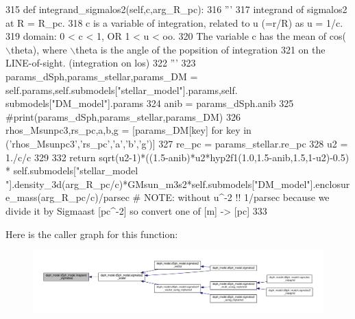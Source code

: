 \begin{DoxyCode}
315     \textcolor{keyword}{def }integrand\_sigmalos2(self,c,arg\_R\_pc):
316         \textcolor{stringliteral}{'''}
317 \textcolor{stringliteral}{        integrand of sigmalos2 at R = R\_pc.}
318 \textcolor{stringliteral}{        c is a variable of integration, related to u (=r/R) as u = 1/c.}
319 \textcolor{stringliteral}{        domain: 0 < c < 1, OR 1 < u < oo.}
320 \textcolor{stringliteral}{        The variable c has the mean of cos(\(\backslash\)theta), where \(\backslash\)theta is the angle of the popsition of
       integration}
321 \textcolor{stringliteral}{        on the LINE-of-sight. (integration on los)}
322 \textcolor{stringliteral}{        '''}
323         params\_dSph,params\_stellar,params\_DM = self.params,self.submodels[\textcolor{stringliteral}{"stellar\_model"}].params,self.
      submodels[\textcolor{stringliteral}{"DM\_model"}].params
324         anib = params\_dSph.anib
325         \textcolor{comment}{#print(params\_dSph,params\_stellar,params\_DM)}
326         rhos\_Msunpc3,rs\_pc,a,b,g = [params\_DM[key] \textcolor{keywordflow}{for} key \textcolor{keywordflow}{in} (\textcolor{stringliteral}{'rhos\_Msunpc3'},\textcolor{stringliteral}{'rs\_pc'},\textcolor{stringliteral}{'a'},\textcolor{stringliteral}{'b'},\textcolor{stringliteral}{'g'})]
327         re\_pc = params\_stellar.re\_pc
328         u2 = 1./c/c
329         
332         \textcolor{keywordflow}{return} sqrt(u2-1)*((1.5-anib)*u2*hyp2f1(1.0,1.5-anib,1.5,1-u2)-0.5) * self.submodels[\textcolor{stringliteral}{"stellar\_model
      "}].density\_3d(arg\_R\_pc/c)*GMsun\_m3s2*self.submodels[\textcolor{stringliteral}{"DM\_model"}].enclosure\_mass(arg\_R\_pc/c)/parsec \textcolor{comment}{# NOTE:
       without u^-2 !! 1/parsec because we divide it by Sigmaast [pc^-2] so convert one of [m] -> [pc]  }
333     
\end{DoxyCode}
Here is the caller graph for this function\+:\nopagebreak
\begin{figure}[H]
\begin{center}
\leavevmode
\includegraphics[width=350pt]{d0/d25/classdsph__model_1_1dSph__model_a97bf665bdc2ff464da2c685f6f182088_icgraph}
\end{center}
\end{figure}
\mbox{\label{classdsph__model_1_1dSph__model_a5df6fa479eb9092d850da8779073eed5}} 
